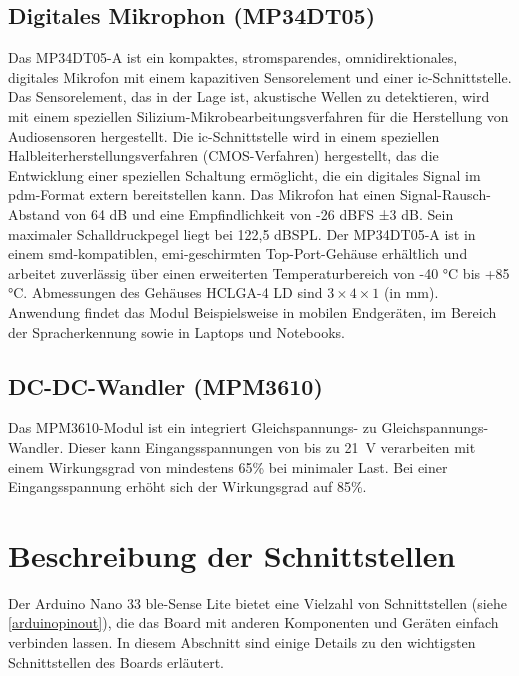 \subsection{Digitales Mikrophon (MP34DT05)}

Das MP34DT05-A ist ein kompaktes, stromsparendes, omnidirektionales, digitales
Mikrofon mit einem kapazitiven Sensorelement und einer \ac{ic}-Schnittstelle.
Das Sensorelement, das in der Lage ist, akustische Wellen zu detektieren, wird mit einem speziellen Silizium-Mikrobearbeitungsverfahren für die Herstellung von
Audiosensoren hergestellt. Die \ac{ic}-Schnittstelle wird in einem speziellen Halbleiterherstellungsverfahren (CMOS-Verfahren\cite{Gehrke.2022}\cite{Bernstein.2020}) hergestellt, das die Entwicklung einer speziellen Schaltung ermöglicht, die ein digitales Signal im \ac{pdm}-Format extern bereitstellen kann. Das Mikrofon hat einen Signal-Rausch-Abstand von 64 dB und eine Empfindlichkeit von -26 dBFS ±3 dB. Sein maximaler Schalldruckpegel liegt bei 122,5 dBSPL. Der MP34DT05-A ist in einem \ac{smd}-kompatiblen, \ac{emi}-geschirmten Top-Port-Gehäuse erhältlich und arbeitet zuverlässig über einen erweiterten Temperaturbereich von -40 °C bis +85 °C. Abmessungen des Gehäuses HCLGA-4 LD sind $3\times 4 \times 1$ (in mm). Anwendung findet das Modul Beispielsweise in mobilen Endgeräten, im Bereich der Spracherkennung sowie in Laptops und Notebooks.\cite{STM3.2021}\cite{Ard.2024}

\subsection{DC-DC-Wandler (MPM3610)}

Das MPM3610-Modul ist ein integriert Gleichspannungs- zu Gleichspannungs-Wandler. Dieser kann Eingangsspannungen von bis zu 21\ V verarbeiten mit einem Wirkungsgrad von mindestens 65\% bei minimaler Last. Bei einer Eingangsspannung erhöht sich der Wirkungsgrad auf 85\%.\cite{Ard.2024}

\section{Beschreibung der Schnittstellen}

Der Arduino Nano 33 \ac{ble}-Sense Lite bietet eine Vielzahl von Schnittstellen (siehe \autoref{arduinopinout}), die das Board mit anderen Komponenten und Geräten einfach verbinden lassen. In diesem Abschnitt sind einige Details zu den wichtigsten Schnittstellen des Boards erläutert.

